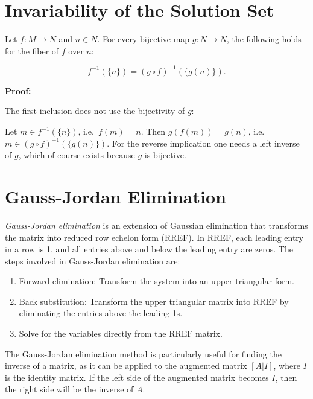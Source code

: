 \section{Invariability of the Solution Set}

Let \( f : M \to N \) and \( n \in N \). For every bijective map \( g : N \to N \), the following holds for the fiber of \( f \) over \( n \):

\[
    f^{-1}(\{n\}) = (g \circ f)^{-1}(\{g(n)\}).
\]

\textbf{Proof:}

The first inclusion does not use the bijectivity of \( g \):

Let \( m \in f^{-1}(\{n\}) \), i.e.\ \( f(m) = n \). Then \( g(f(m)) = g(n) \), i.e.\ \( m \in (g \circ f)^{-1}(\{g(n)\}) \).
For the reverse implication one needs a left inverse of \( g \), which of course exists because \( g \) is bijective.

\QED 

\section{Gauss-Jordan Elimination}

\emph{Gauss-Jordan elimination} is an extension of Gaussian elimination that transforms the matrix into reduced row echelon form (RREF). In RREF, each 
leading entry in a row is 1, and all entries above and below the leading entry are zeros. The steps involved in Gauss-Jordan elimination are:

\begin{enumerate}

    \item Forward elimination: Transform the system into an upper triangular form.

    \item Back substitution: Transform the upper triangular matrix into RREF by eliminating the entries
          above the leading 1s.

    \item Solve for the variables directly from the RREF matrix.

\end{enumerate}

The Gauss-Jordan elimination method is particularly useful for finding the inverse of a matrix, as it can be applied to the augmented matrix \([A | I]\), 
where \(I\) is the identity matrix. If the left side of the augmented matrix becomes \(I\), then the right side will be the inverse of \(A\).

